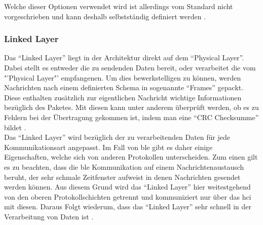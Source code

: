 \noindent Welche dieser Optionen verwendet wird ist allerdings vom Standard nicht vorgeschrieben und kann deshalb selbstständig definiert werden \cite[Seite 411]{Sauter18:GMK}.\\

\noindent 

\subsubsection{Linked Layer}
\label{sss:funktionsweise:linked}

Das "`Linked Layer"' liegt in der Architektur direkt auf dem "`Physical Layer"'. Dabei stellt es entweder die zu sendenden Daten bereit, oder verarbeitet die vom "'Physical Layer"' empfangenen. Um dies bewerkstelligen zu können, werden Nachrichten nach einem definierten Schema in sogenannte "`Frames"' gepackt. Diese enthalten zusätzlich zur eigentlichen Nachricht wichtige Informationen bezüglich des Paketes. Mit diesen kann unter anderem überprüft werden, ob es zu Fehlern bei der Übertragung gekommen ist, indem man eine "`CRC Checksumme"' bildet \cite[Seite 194]{Tanenbaum14:CN}.\\

\noindent Das "`Linked Layer"' wird bezüglich der zu verarbeitenden Daten für jede Kommunikationsart angepasst. Im Fall von \ac{ble} gibt es daher einige Eigenschaften, welche sich von anderen Protokollen unterscheiden. Zum einen gilt es zu beachten, dass die \ac{ble} Kommunikation auf einem Nachrichtenaustausch beruht, der sehr schmale Zeitfenster aufweist in denen Nachrichten gesendet werden können. Aus diesem Grund wird das "`Linked Layer"' hier weitestgehend von den oberen Protokollschichten getrennt und kommuniziert nur über das \ac{hci} mit diesen. Daraus Folgt wiederum, dass das "`Linked Layer"' sehr schnell in der Verarbeitung von Daten ist \cite[Seite 17f]{Townsend14:GSB}.\\

